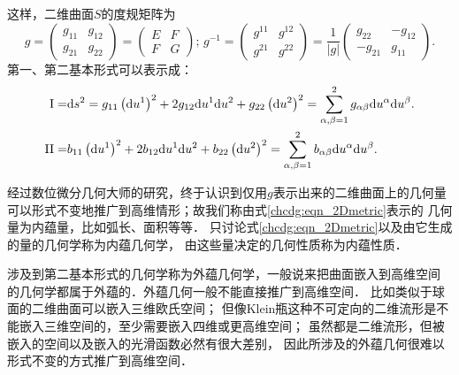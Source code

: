 这样，二维曲面$S$的度规矩阵为
\setlength{\mathindent}{0em}
\begin{equation}\label{chcdg:eqn_2Dmetric}
    g=\begin{pmatrix} g_{11} & g_{12} \\ g_{21} & g_{22}  \end{pmatrix}
    =\begin{pmatrix} E & F \\ F & G \end{pmatrix} ; \,
    g^{-1}= \begin{pmatrix} g^{11} & g^{12} \\ g^{21} & g^{22}  \end{pmatrix}
    =\frac{1}{|g|}\begin{pmatrix} g_{22} & -g_{12} \\ -g_{21} & g_{11} \end{pmatrix} .
\end{equation}\setlength{\mathindent}{2em}
第一、第二基本形式可以表示成：
\begin{align}
    {\rm I}=& {\rm d}s^2 = g_{11} \left({\rm d}u^1\right)^2 +2g_{12} {\rm d}u^1{\rm d}u^2
      +g_{22} \left({\rm d}u^2\right)^2= \sum_{\alpha,\beta=1}^{2} g_{\alpha\beta} {\rm d}u^\alpha {\rm d}u^\beta.
       \label{chcdg:eqn_Iform-tensor} \\
    {\rm II}=& b_{11} \left({\rm d}u^1\right)^2 +2b_{12} {\rm d}u^1{\rm d}u^2
      +b_{22} \left({\rm d}u^2\right)^2= \sum_{\alpha,\beta=1}^{2} b_{\alpha\beta} {\rm d}u^\alpha {\rm d}u^\beta.
    \label{chcdg:eqn_IIform-tensor} 
\end{align}

经过数位微分几何大师的研究，终于认识到仅用$g$表示出来的二维曲面上的几何量
可以形式不变地推广到高维情形；故我们称由式\eqref{chcdg:eqn_2Dmetric}表示的
几何量为{\heiti 内蕴量}，比如弧长、面积等等．
只讨论式\eqref{chcdg:eqn_2Dmetric}以及由它生成的量的几何学称为{\heiti 内蕴几何学}，
由这些量决定的几何性质称为{\heiti 内蕴性质}．

涉及到第二基本形式的几何学称为{\heiti 外蕴几何学}，一般说来把曲面嵌入到高维空间
的几何学都属于外蕴的．外蕴几何一般不能直接推广到高维空间．
比如类似于球面的二维曲面可以嵌入三维欧氏空间；
但像Klein瓶这种不可定向的二维流形是不能嵌入三维空间的，至少需要嵌入四维或更高维空间；
虽然都是二维流形，但被嵌入的空间以及嵌入的光滑函数必然有很大差别，
因此所涉及的外蕴几何很难以形式不变的方式推广到高维空间．




